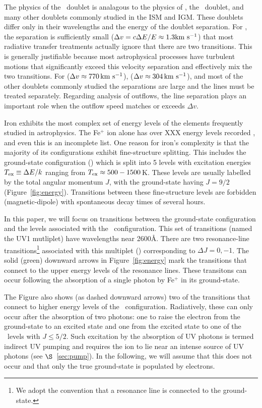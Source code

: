 \documentclass[12pt,preprint]{aastex}
\begin{document}
The physics of the \mgiid\ doublet
is analagous to the physics of 
\lya, the \naid\ doublet, and many other doublets commonly
studied in the ISM and IGM.  These doublets differ only in
their wavelengths and the energy of the doublet separation. 
For  \lya, the
separation is sufficiently small ($\Delta v = c \Delta E / E \approx
1.3 {\rm km~s^{-1}}$) that most radiative transfer treatments actually ignore that
there are two transitions.   This is generally justifiable
because 
most astrophysical processes have turbulent motions that
significantly exceed this velocity separation and effectively mix the
two transitions.  For  ($\Delta v \approx 770 \, {\rm km~s^{-1}}$),  
 ($\Delta v \approx 304 \, {\rm km~s^{-1}}$), and most of the other doublets
commonly studied the separations are large and the lines
must be treated separately.  Regarding analysis of outflows, the line
separation plays an important role when the outflow speed matches or
exceeds $\Delta v$.

Iron exhibits the most complex set of energy levels of the elements
frequently studied in astrophysics.  The Fe$^+$ ion alone has over XXX
energy levels recorded \citep{iron}, and even this is an
incomplete list.  
One reason for iron's complexity is
that the majority of its configurations exhibit fine-structure splitting.
This includes the ground-state configuration (\aconfig) which is split
into 5 levels with 
excitation energies $T_{\rm ex} \equiv \Delta E / k$ ranging from
$T_{\rm ex} \approx 500-1500$\,K.  These levels are usually labelled by the total angular momentum
$J$, with the ground-state having $J=9/2$ (Figure~\ref{fig:energy}).  
Transitions between these fine-structure levels are 
forbidden (magnetic-dipole) with spontaneous decay times of several hours.  

In this paper, we will focus on transitions between the ground-state
configuration and the levels associated with the \zconfig\
configuration.  This set of transitions (named the
UV1 mutliplet) have wavelengths near 2600\AA.
There are two resonance-line transitions\footnote{We adopt the
  convention that a resonance line is connected to the ground-state.} 
associated with this multiplet (\feiid)
corresponding to $\Delta J = 0, -1$.  The solid (green) downward
arrows in Figure~\ref{fig:energy} mark the transitions that connect to
the upper energy levels of the resonance lines.  These transitons can
occur following the absorption of a single photon by Fe$^+$ in its
ground-state.  

The Figure also shows (as dashed downward arrows) two of the
transitions that connect to higher energy levels of the \zconfig\
configuration.  Radiatively, these can only occur after the absorption
of two photons: one to raise the electron from the ground-state to an
excited state and one from the excited state to one of the \zconfig\
levels with $J \le 5/2$.  Such excitation by the
absorption of UV photons is termed indirect UV pumping
\citep[e.g][]{sv02,pcb06} and requires the ion to lie
near an intense source of UV photons (see $\S$~\ref{sec:pump}).  In the
following, we will assume that this does not occur and that only the 
true ground-state is populated by electrons. 
\end{document}
